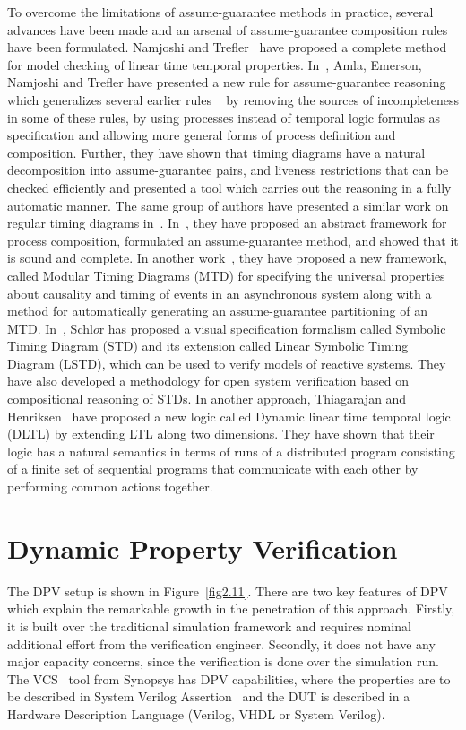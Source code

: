 \noindent
To overcome the limitations of assume-guarantee methods in practice, several
advances have been made and an arsenal of assume-guarantee composition rules
have been formulated. Namjoshi and Trefler~\cite{namjoshi} have proposed a
complete method for model checking of linear time temporal properties. 
In~\cite{amla1}, Amla, Emerson, Namjoshi and Trefler have presented a
new rule for assume-guarantee reasoning which generalizes several earlier rules
~\cite{abadi:95,jones,namjoshi,pnueli:84} by removing the sources of
incompleteness in some of these rules, by using processes instead of temporal
logic formulas as specification and allowing more general forms of process
definition and composition. Further, they have shown that timing diagrams
have a natural decomposition into assume-guarantee pairs, and liveness
restrictions that can be checked efficiently and presented a tool which
carries out the reasoning in a fully automatic manner. The same group of
authors have presented a similar work on regular timing diagrams
in~\cite{amla2,amla3}. In~\cite{amla4}, they have  proposed
an abstract framework for process composition, formulated an assume-guarantee
method, and showed that it is sound and complete. In another
work~\cite{amla5}, they have proposed a new framework, called Modular Timing
Diagrams (MTD) for specifying the universal properties about causality and
timing of events in an asynchronous system along with a method for
automatically generating an assume-guarantee partitioning of an MTD.
In~\cite{schloer}, Schl$\ddot{o}$r has proposed a visual specification
formalism called Symbolic Timing Diagram (STD) and its extension called
Linear Symbolic Timing Diagram (LSTD), which can be used to verify models of
reactive systems. They have also developed a methodology for open system 
verification based on compositional reasoning of STDs.
In another approach, Thiagarajan and Henriksen~\cite{dltl}
have proposed a new logic
called Dynamic linear time temporal logic (DLTL) by extending LTL along
two dimensions. They have shown that their logic has a natural semantics in
terms of runs of a distributed program consisting of a finite set of
sequential programs that communicate with each other by performing
common actions together. 

\section{Dynamic Property Verification} \label{sec2.4}
The DPV setup is shown in Figure~\ref{fig2.11}.
There are two key features of DPV which explain the remarkable growth
in the penetration of this approach. Firstly, it is built over the
traditional simulation framework and requires nominal additional effort
from the verification engineer. Secondly, it does not have any major capacity
concerns, since the verification is done over the simulation run.
The VCS~\cite{vcs} tool from Synopsys has DPV capabilities, where
the properties are to be described in System Verilog Assertion~\cite{sva}
and the DUT is described in a Hardware Description Language (Verilog,
VHDL or System Verilog).

